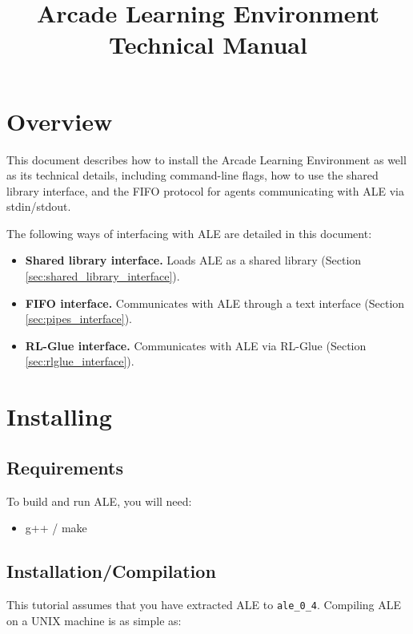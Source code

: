 \documentclass[12pt]{article}
\title{Arcade Learning Environment\\ Technical Manual}
\author{}
\begin{document}
\maketitle
\tableofcontents

\section{Overview}

This document describes how to install the Arcade Learning Environment as well as its technical 
details, including 
command-line flags, how to use the shared library interface, and the FIFO protocol 
for agents communicating with ALE via stdin/stdout.

The following ways of interfacing with ALE are detailed in this document:

\begin{itemize}
  \item{\textbf{Shared library interface.} Loads ALE as a shared library (Section \ref{sec:shared_library_interface}).}
  \item{\textbf{FIFO interface.} Communicates with ALE through a text interface (Section \ref{sec:pipes_interface}).}
  \item{\textbf{RL-Glue interface.} Communicates with ALE via RL-Glue (Section \ref{sec:rlglue_interface}).}
\end{itemize}

\section{Installing}

\subsection{Requirements}

To build and run ALE, you will need:

\begin{itemize}
  \item{g++ / make}
\end{itemize}

\subsection{Installation/Compilation}

This tutorial assumes that you have extracted ALE to \verb+ale_0_4+. Compiling
ALE on a UNIX machine is as simple as:
\end{document}
